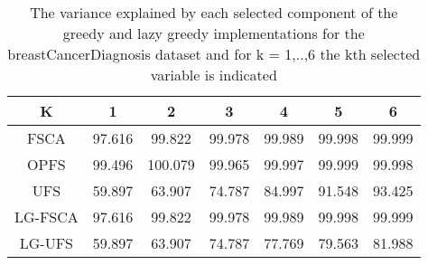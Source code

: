 \begin{table}
	\begin{center}
		\begin{tabular}{c c c c c c c}
			K & 1 & 2 & 3 & 4 & 5 & 6 \\
			\hline
			FSCA & 97.616 & 99.822 & 99.978 & 99.989 & 99.998 & 99.999 \\
			OPFS & 99.496 & 100.079 & 99.965 & 99.997 & 99.999 & 99.998 \\
			UFS & 59.897 & 63.907 & 74.787 & 84.997 & 91.548 & 93.425 \\
			LG-FSCA & 97.616 & 99.822 & 99.978 & 99.989 & 99.998 & 99.999 \\
			LG-UFS & 59.897 & 63.907 & 74.787 & 77.769 & 79.563 & 81.988 \\
		\end{tabular}
	\end{center}
	\caption{The variance explained by each selected component of the greedy and lazy greedy implementations for the breastCancerDiagnosis dataset and for k = 1,..,6 the kth selected variable is indicated}
\end{table}